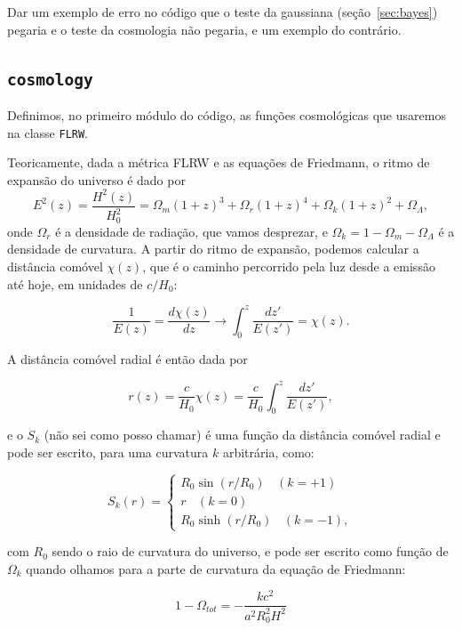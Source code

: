 \documentclass[11pt,a4paper]{article}
\newcommand{\Om}{\Omega_m}
\newcommand{\OL}{\Omega_\Lambda}
\newcommand{\Ok}{\Omega_k}
\begin{document}
\begin{escrever}
Dar um exemplo de erro no código que o teste da gaussiana (seção~\ref{sec:bayes})
pegaria e o teste da cosmologia não pegaria, e um exemplo do contrário.
\end{escrever}

\subsection{\texttt{cosmology}}
\label{sec:cosmo}

Definimos, no primeiro módulo do código, as funções cosmológicas que usaremos na classe \texttt{FLRW}.

Teoricamente, dada a métrica FLRW e as equações de Friedmann, o ritmo de expansão do universo é dado por
\begin{equation}
E^2(z)= \frac{H^2(z)}{H_0^2} = \Om(1+z)^3 + \Omega_r(1+z)^4 + \Ok(1+z)^2 + \OL,
\end{equation}
onde $\Omega_r$ é a densidade de radiação, que vamos desprezar, e $\Ok = 1 - \Om - \OL$ é a densidade de curvatura. A partir do ritmo de expansão, 
podemos calcular a distância comóvel $\chi(z)$, que é o caminho percorrido pela luz desde a emissão até hoje, em unidades de $c/H_0$:


$$
\frac{1}{E(z)}=\frac{d\chi(z)}{dz}\to \int_0^z \frac{dz'}{E(z')}=\chi(z).
$$

A distância comóvel radial é então dada por

$$
r(z)=\frac{c}{H_0}\chi(z)=\frac{c}{H_0}\int_0^z \frac{dz'}{E(z')},
$$

e o $S_k$ (não sei como posso chamar) é uma função da distância comóvel radial e pode ser escrito, para uma curvatura $k$ arbitrária, como:

\begin{equation}
S_k(r)=\begin{cases}
R_0 \sin (r/R_0)\ \ \ \ (k=+1)    \\
r \ \ \ \ (k=0)    \\
R_0 \sinh (r/R_0)\ \ \ \ (k=-1),
\end{cases}
\end{equation}

com $R_0$ sendo o raio de curvatura do universo, e pode ser escrito como função de $\Omega_k$ quando olhamos para a parte de curvatura da equação de Friedmann:

\begin{equation}
1-\Omega_{tot}=-\frac{k c^2}{a^2 R_0^2 H^2}
\end{equation}
\end{document}
